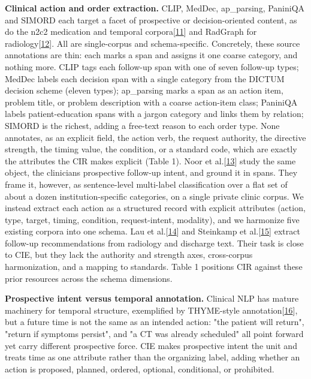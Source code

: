 \textbf{Clinical action and order extraction.} CLIP, MedDec, ap\_parsing, PaniniQA and SIMORD each target a facet of prospective or decision-oriented content, as do the n2c2 medication and temporal corpora{[}\hyperref[r11]{11}{]} and RadGraph for radiology{[}\hyperref[r12]{12}{]}. All are single-corpus and schema-specific. Concretely, these source annotations are thin: each marks a span and assigns it one coarse category, and nothing more. CLIP tags each follow-up span with one of seven follow-up types; MedDec labels each decision span with a single category from the DICTUM decision scheme (eleven types); ap\_parsing marks a span as an action item, problem title, or problem description with a coarse action-item class; PaniniQA labels patient-education spans with a jargon category and links them by relation; SIMORD is the richest, adding a free-text reason to each order type. None annotates, as an explicit field, the action verb, the request authority, the directive strength, the timing value, the condition, or a standard code, which are exactly the attributes the CIR makes explicit (Table 1). Noor et al.{[}\hyperref[r13]{13}{]} study the same object, the clinician\textquotesingle s prospective follow-up intent, and ground it in spans. They frame it, however, as sentence-level multi-label classification over a flat set of about a dozen institution-specific categories, on a single private clinic corpus. We instead extract each action as a structured record with explicit attributes (action, type, target, timing, condition, request-intent, modality), and we harmonize five existing corpora into one schema. Lau et al.{[}\hyperref[r14]{14}{]} and Steinkamp et al.{[}\hyperref[r15]{15}{]} extract follow-up recommendations from radiology and discharge text. Their task is close to CIE, but they lack the authority and strength axes, cross-corpus harmonization, and a mapping to standards. Table 1 positions CIR against these prior resources across the schema dimensions.

\textbf{Prospective intent versus temporal annotation.} Clinical NLP has mature machinery for temporal structure, exemplified by THYME-style annotation{[}\hyperref[r16]{16}{]}, but a future time is not the same as an intended action: "the patient will return", "return if symptoms persist", and "a CT was already scheduled" all point forward yet carry different prospective force. CIE makes prospective intent the unit and treats time as one attribute rather than the organizing label, adding whether an action is proposed, planned, ordered, optional, conditional, or prohibited.


